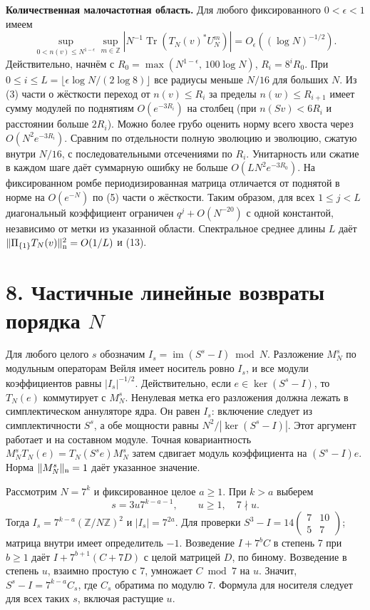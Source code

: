 \documentclass[11pt,a4paper]{article}
\newcommand{\Tr}{\operatorname{Tr}}
\newcommand{\Z}{\mathbb Z}
\newcommand{\sect}[1]{\section*{\sffamily\color{ink}#1}}
\newcommand{\subt}[1]{\par\medskip\noindent\textbf{#1.}\quad}
\begin{document}
\subt{Количественная малочастотная область} Для любого фиксированного $0<\epsilon<1$ имеем
\[
       \sup_{0<n(v)\le N^{1-\epsilon}}\sup_{m\in\Z}
                         |N^{-1}\Tr(T_N(v)^*U_N^m)|
                              =O_\epsilon((\log N)^{-1/2}).         \tag{13}
\]
Действительно, начнём с $R_0=\max(N^{1-\epsilon},\,100\log N)$, $R_i=8^iR_0$. При $0\le i\le L=\lfloor\epsilon\log N/(2\log 8)\rfloor$ все радиусы меньше $N/16$ для больших $N$. Из (3) части о жёсткости переход от $n(v)\le R_i$ за пределы $n(w)\le R_{i+1}$ имеет сумму модулей по поднятиям $O(e^{-3R_i})$ на столбец (при $n(Sv)<6R_i$ и расстоянии больше $2R_i$). Можно более грубо оценить норму всего хвоста через $O(N^2e^{-3R_i})$. Сравним по отдельности полную эволюцию и эволюцию, сжатую внутри $N/16$, с последовательными отсечениями по $R_i$. Унитарность или сжатие в каждом шаге даёт суммарную ошибку не больше $O(LN^2e^{-3R_0})$. На фиксированном ромбе периодизированная матрица отличается от поднятой в норме на $O(e^{-N})$ по (5) части о жёсткости. Таким образом, для всех $1\le j<L$ диагональный коэффициент ограничен $q^j+O(N^{-20})$ с одной константой, независимо от метки из указанной области. Спектральное среднее длины $L$ даёт $\|\Pi_{\{1\}}T_N(v)\|_{\rm n}^2=O(1/L)$ и (13).
\newpage
\sect{8. Частичные линейные возвраты порядка $N$}
Для любого целого $s$ обозначим $I_s=\operatorname{im}(S^s-I)\bmod N$. Разложение $M_N^s$ по модульным операторам Вейля имеет носитель ровно $I_s$, и все модули коэффициентов равны $|I_s|^{-1/2}$. Действительно, если $e\in\ker(S^s-I)$, то $T_N(e)$ коммутирует с $M_N^s$. Ненулевая метка его разложения должна лежать в симплектическом аннуляторе ядра. Он равен $I_s$: включение следует из симплектичности $S^s$, а обе мощности равны $N^2/|\ker(S^s-I)|$. Этот аргумент работает и на составном модуле. Точная ковариантность $M_N^sT_N(e)=T_N(S^se)M_N^s$ затем сдвигает модуль коэффициента на $(S^s-I)e$. Норма $\|M_N^s\|_{\rm n}=1$ даёт указанное значение.

Рассмотрим $N=7^k$ и фиксированное целое $a\ge1$. При $k>a$ выберем
\[
                   s=3u7^{k-a-1},\qquad u\ge1,\quad 7\nmid u .
\]
Тогда $I_s=7^{k-a}(\Z/N\Z)^2$ и $|I_s|=7^{2a}$. Для проверки $S^3-I=14\left(\begin{smallmatrix}7&10\\5&7\end{smallmatrix}\right)$; матрица внутри имеет определитель $-1$. Возведение $I+7^b C$ в степень 7 при $b\ge1$ даёт $I+7^{b+1}(C+7D)$ с целой матрицей $D$, по биному. Возведение в степень $u$, взаимно простую с 7, умножает $C\bmod7$ на $u$. Значит, $S^s-I=7^{k-a}C_s$, где $C_s$ обратима по модулю 7. Формула для носителя следует для всех таких $s$, включая растущие $u$.
\end{document}
